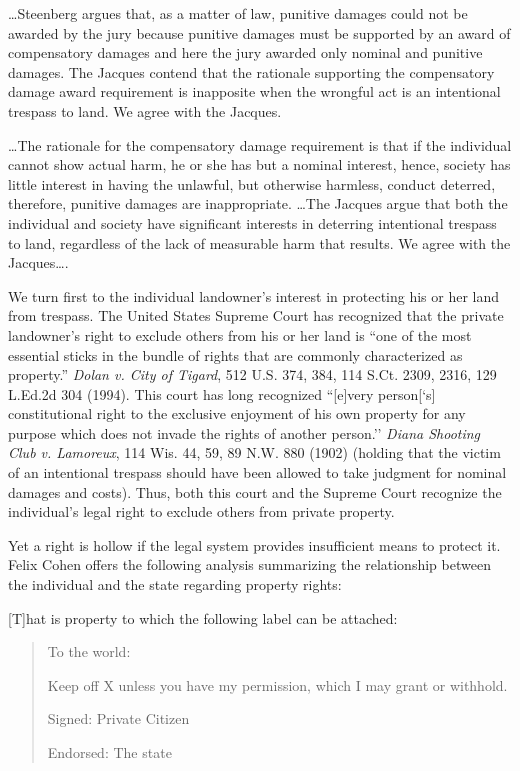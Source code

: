 
\ldots Steenberg argues that, as a matter of law, punitive damages could not be
awarded by the jury because punitive damages must be supported by an award of
compensatory damages and here the jury awarded only nominal and punitive
damages. The Jacques contend that the rationale supporting the compensatory
damage award requirement is inapposite when the wrongful act is an intentional
trespass to land. We agree with the Jacques.

\ldots The rationale for the compensatory damage requirement is that if the
individual cannot show actual harm, he or she has but a nominal interest,
hence, society has little interest in having the unlawful, but otherwise
harmless, conduct deterred, therefore, punitive damages are inappropriate.
\ldots The Jacques argue that both the individual and society have significant
interests in deterring intentional trespass to land, regardless of the lack of
measurable harm that results. We agree with the Jacques\ldots.

We turn first to the individual landowner's interest in protecting his or her
land from trespass. The United States Supreme Court has recognized that the
private landowner's right to exclude others from his or her land is ``one of
the most essential sticks in the bundle of rights that are commonly
characterized as property.'' \textit{Dolan v. City of Tigard}, 512 U.S. 374,
384, 114 S.Ct. 2309, 2316, 129 L.Ed.2d 304 (1994). This court has long
recognized ``[e]very person[`s] constitutional right to the exclusive enjoyment
of his own property for any purpose which does not invade the rights of another
person.'' \textit{Diana Shooting Club v. Lamoreux}, 114 Wis. 44, 59, 89 N.W.
880 (1902) (holding that the victim of an intentional trespass should have been
allowed to take judgment for nominal damages and costs). Thus, both this court
and the Supreme Court recognize the individual's legal right to exclude others
from private property.

Yet a right is hollow if the legal system provides insufficient means to protect
it. Felix Cohen offers the following analysis summarizing the relationship
between the individual and the state regarding property rights:

[T]hat is property to which the following label can be attached:

\begin{quotation}
To the world:

Keep off X unless you have my permission, which I may grant or withhold.

Signed: Private Citizen

Endorsed: The state
\end{quotation}

